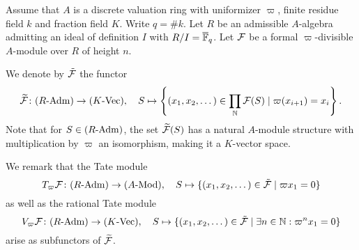 \documentclass[../main.tex]{subfiles}
\begin{document}
Assume that $A$ is a discrete valuation ring with uniformizer
$\varpi$, finite residue field $k$ and fraction field $K$. 
Write $q = \# k$. Let $R$ be an admissible $A$-algebra admitting an ideal of definition
$I$ with $R/I = {\overline {\mathbb{F}}_q}$. Let $\mathcal{F}$ be a formal
$\varpi$-divisible $A$-module over $R$ of height $n$. 
\begin{defi}
  We denote by $\tilde {\mathcal{F}}$ the functor
  \begin{equation*}
    \widetilde{\mathcal{F}} \colon {({R}\text-\allowbreak\mathrm{Adm})} \to {({K}\text-\allowbreak\mathrm{Vec})}, \quad
    S \mapsto \left\{(x_1, x_2, \dots) \in \prod_{\mathbb{N}} \mathcal{F}(S) \mid \varpi (x_{i+1}) =
    x_i \right\}.
  \end{equation*}
  Note that for $S \in {({R}\text-\allowbreak\mathrm{Adm})}$, the set $\widetilde{\mathcal{F}}(S)$ has a natural
  $A$-module structure with multiplication by $\varpi$ an isomorphism, making
  it a $K$-vector space.
\end{defi}

We remark that the Tate module
\begin{equation}\label{eq:TateModuleDef}
  T_\varpi \mathcal{F} \colon {({R}\text-\allowbreak\mathrm{Adm})} \to {({A}\text-\allowbreak\mathrm{Mod})}, \quad S \mapsto \{(x_1, x_2, \dots)
  \in \tilde {\mathcal{F}} \mid \varpi x_1 = 0\}
\end{equation}
as well as the rational Tate module 
\begin{equation}\label{eq:RationalTateModuleDef}
  V_\varpi \mathcal{F} \colon {({R}\text-\allowbreak\mathrm{Adm})} \to {({K}\text-\allowbreak\mathrm{Vec})}, \quad S \mapsto \{(x_1, x_2, \dots)
  \in \tilde {\mathcal{F}} \mid \exists n \in \mathbb{N} : \varpi^n x_1 = 0\}
\end{equation}
arise as subfunctors of $\widetilde{\mathcal{F}}$. 
\end{document}
